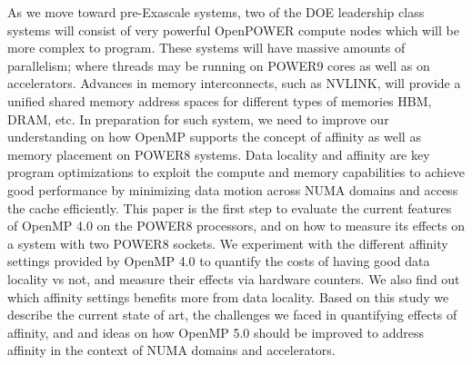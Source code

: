 As we move toward pre-Exascale systems, two of the DOE leadership class systems will consist of very powerful OpenPOWER compute nodes which will be more complex to program. These systems will have massive amounts of parallelism; where threads may be running on POWER9 cores as well as on accelerators. Advances in memory interconnects, such as NVLINK, will provide a unified shared memory address spaces for different types of memories HBM, DRAM, etc. In preparation for such system, we need to improve our understanding on how OpenMP supports the concept of affinity as well as memory placement on POWER8 systems.%
Data locality and affinity are key 
program optimizations to exploit the compute and memory capabilities to achieve good performance by minimizing data motion across NUMA domains and access the cache efficiently. This paper is the first step to evaluate the current features of OpenMP 4.0 on the POWER8 processors, and on how to measure its effects on a system with two POWER8 sockets. We experiment with the different affinity settings provided by OpenMP 4.0 to quantify the costs of having good data locality vs not,  and measure their effects via hardware counters. We also find out which affinity settings benefits more from data locality. Based on this study we describe the current state of art, the challenges we faced in quantifying effects of affinity, and and ideas on how OpenMP 5.0 should be improved to address affinity in the context of NUMA domains and accelerators.

